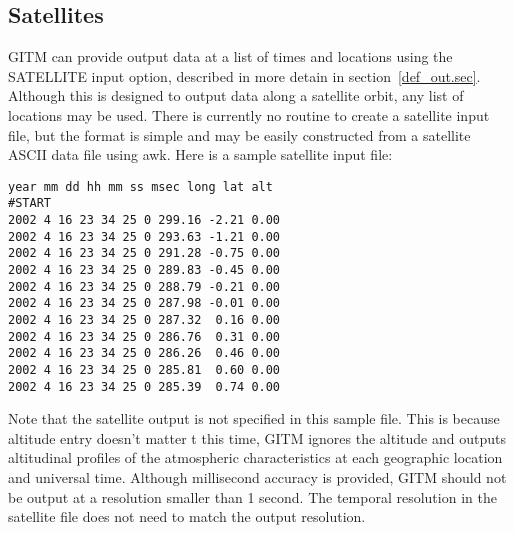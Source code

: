 \subsection{Satellites}
\label{sat_aux.sec}

GITM can provide output data at a list of times and locations using the SATELLITE input option, described in more detain in section~\ref{def_out.sec}.  Although this is designed to output data along a satellite orbit, any list of locations may be used.  There is currently no routine to create a satellite input file, but the format is simple and may be easily constructed from a satellite ASCII data file using awk.  Here is a sample satellite input file:

\begin{verbatim}
year mm dd hh mm ss msec long lat alt
#START
2002 4 16 23 34 25 0 299.16 -2.21 0.00 
2002 4 16 23 34 25 0 293.63 -1.21 0.00 
2002 4 16 23 34 25 0 291.28 -0.75 0.00 
2002 4 16 23 34 25 0 289.83 -0.45 0.00 
2002 4 16 23 34 25 0 288.79 -0.21 0.00 
2002 4 16 23 34 25 0 287.98 -0.01 0.00 
2002 4 16 23 34 25 0 287.32  0.16 0.00 
2002 4 16 23 34 25 0 286.76  0.31 0.00 
2002 4 16 23 34 25 0 286.26  0.46 0.00 
2002 4 16 23 34 25 0 285.81  0.60 0.00 
2002 4 16 23 34 25 0 285.39  0.74 0.00
\end{verbatim}

Note that the satellite output is not specified in this sample file.  This is because altitude entry doesn't matter t this time, GITM ignores the altitude and outputs altitudinal profiles of the atmospheric characteristics at each geographic location and universal time.  Although millisecond accuracy is provided, GITM should not be output at a resolution smaller than 1 second.  The temporal resolution in the satellite file does not need to match the output resolution.

